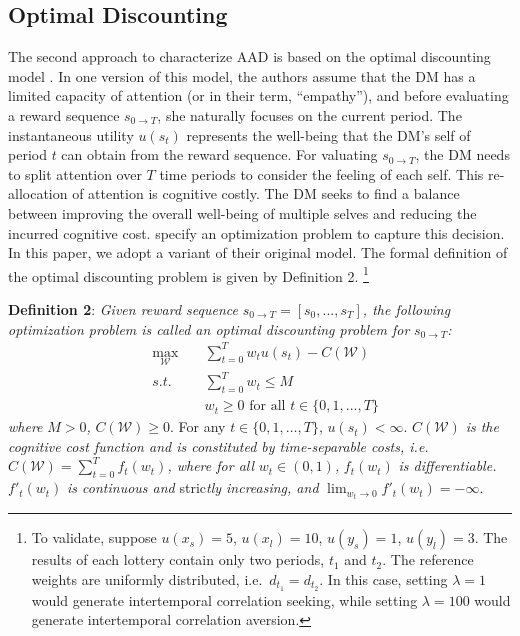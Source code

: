 \documentclass[
  12pt,
]{article}
\begin{document}
\hypertarget{optimal-discounting}{%
\subsection{\texorpdfstring{Optimal Discounting
\label{optimal_discount}}{Optimal Discounting }}\label{optimal-discounting}}

The second approach to characterize AAD is based on the optimal
discounting model \citep{noor2022optimal,noor2024constrained}. In one
version of this model, the authors assume that the DM has a limited
capacity of attention (or in their term, ``empathy''), and before
evaluating a reward sequence \(s_{0\rightarrow T}\), she naturally
focuses on the current period. The instantaneous utility \(u(s_t)\)
represents the well-being that the DM's self of period \(t\) can obtain
from the reward sequence. For valuating \(s_{0\rightarrow T}\), the DM
needs to split attention over \(T\) time periods to consider the feeling
of each self. This re-allocation of attention is cognitive costly. The
DM seeks to find a balance between improving the overall well-being of
multiple selves and reducing the incurred cognitive cost.
\citet{noor2022optimal,noor2024constrained} specify an optimization
problem to capture this decision. In this paper, we adopt a variant of
their original model. The formal definition of the optimal discounting
problem is given by Definition 2. \footnote{To validate, suppose
  \(u(x_s)=5\), \(u(x_l)=10\), \(u(y_s)=1\), \(u(y_l)=3\). The results
  of each lottery contain only two periods, \(t_1\) and \(t_2\). The
  reference weights are uniformly distributed, i.e.~\(d_{t_1}=d_{t_2}\).
  In this case, setting \(\lambda=1\) would generate intertemporal
  correlation seeking, while setting \(\lambda=100\) would generate
  intertemporal correlation aversion.}

\noindent \textbf{Definition 2}: \emph{Given reward sequence}
\(s_{0\rightarrow T}=[s_0,...,s_T]\)\emph{, the following optimization
problem is called an optimal discounting problem for}
\(s_{0\rightarrow T}\)\emph{:}\[
\begin{aligned}
&\max_{\mathcal{W}}\;&&\sum_{t=0}^T w_tu(s_t) - C(\mathcal{W}) \\
&s.t.\; &&\sum_{t=0}^Tw_t \leq M \\
&&& w_t \geq 0 \text{ for all } t\in \{0,1,...,T\}
\end{aligned}
\]\emph{where} \(M>0\)\emph{,} \(C(\mathcal{W})\geq 0\). For any
\(t\in\{0,1,…,T\}\), \(u(s_t)<\infty\). \(C(\mathcal{W})\) \emph{is the
cognitive cost function and is constituted by time-separable costs,
i.e.} \(C(\mathcal{W})=\sum_{t=0}^Tf_t(w_t)\)\emph{, where for all}
\(w_t\in(0,1)\)\emph{,} \(f_t(w_t)\) \emph{is differentiable.}
\(f'_t(w_t)\) \emph{is continuous and} stric\emph{tly increasing, and}
\(\lim_{w_t\rightarrow 0} f'_t(w_t)=-\infty\).
\end{document}
